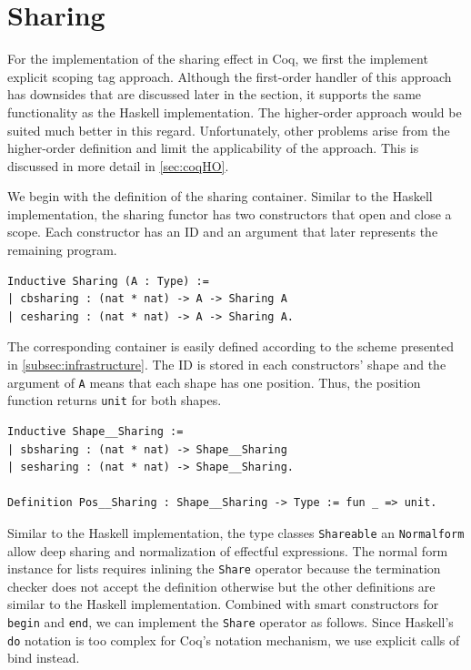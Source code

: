 \documentclass[a4paper, 11pt, fleqn, twoside]{scrreprt}
\newcommand{\hinl}[1]{\texttt{#1}}
\newcommand{\cinl}[1]{\texttt{#1}}
\begin{document}
\section{Sharing}
\label{sec:lawsOfSharing}
For the implementation of the sharing effect in Coq, we first the implement explicit scoping tag approach.
Although the first-order handler of this approach has downsides that are discussed later in the section, it supports the same functionality as the Haskell implementation.
The higher-order approach would be suited much better in this regard.
Unfortunately, other problems arise from the higher-order definition and limit the applicability of the approach.
This is discussed in more detail in \autoref{sec:coqHO}.

We begin with the definition of the sharing container.
Similar to the Haskell implementation, the sharing functor has two constructors that open and close a scope.
Each constructor has an ID and an argument that later represents the remaining program.

\begin{verbatim}
Inductive Sharing (A : Type) :=
| cbsharing : (nat * nat) -> A -> Sharing A
| cesharing : (nat * nat) -> A -> Sharing A.
\end{verbatim}

The corresponding container is easily defined according to the scheme presented in \autoref{subsec:infrastructure}.
The ID is stored in each constructors' shape and the argument of \cinl{A} means that each shape has one position.
Thus, the position function returns \cinl{unit} for both shapes.

\begin{verbatim}
Inductive Shape__Sharing :=
| sbsharing : (nat * nat) -> Shape__Sharing
| sesharing : (nat * nat) -> Shape__Sharing.

Definition Pos__Sharing : Shape__Sharing -> Type := fun _ => unit.
\end{verbatim}

Similar to the Haskell implementation, the type classes \cinl{Shareable} an \cinl{Normalform} allow deep sharing and normalization of effectful expressions.
The normal form instance for lists requires inlining the \cinl{Share} operator because the termination checker does not accept the definition otherwise but the other definitions are similar to the Haskell implementation.
Combined with smart constructors for \cinl{begin} and \cinl{end}, we can implement the \cinl{Share} operator as follows.
Since Haskell's \hinl{do} notation is too complex for Coq's notation mechanism, we use explicit calls of bind instead.
\end{document}
